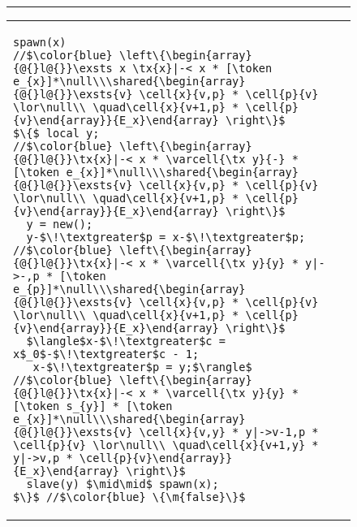 \begin{figure}
\centering
\noindent\hrule
\begin{tabular}{@{} l @{\hspace{4ex}} l@{}}
{\begin{lstlisting}
spawn(x)
//$\color{blue} \left\{\begin{array}{@{}l@{}}\exsts x \tx{x}|-< x * [\token e_{x}]*\null\\\shared{\begin{array}{@{}l@{}}\exsts{v} \cell{x}{v,p} * \cell{p}{v} \lor\null\\ \quad\cell{x}{v+1,p} * \cell{p}{v}\end{array}}{E_x}\end{array} \right\}$
$\{$ local y;
//$\color{blue} \left\{\begin{array}{@{}l@{}}\tx{x}|-< x * \varcell{\tx y}{-} * [\token e_{x}]*\null\\\shared{\begin{array}{@{}l@{}}\exsts{v} \cell{x}{v,p} * \cell{p}{v} \lor\null\\ \quad\cell{x}{v+1,p} * \cell{p}{v}\end{array}}{E_x}\end{array} \right\}$
  y = new();
  y-$\!\textgreater$p = x-$\!\textgreater$p;
//$\color{blue} \left\{\begin{array}{@{}l@{}}\tx{x}|-< x * \varcell{\tx y}{y} * y|->-,p * [\token e_{p}]*\null\\\shared{\begin{array}{@{}l@{}}\exsts{v} \cell{x}{v,p} * \cell{p}{v} \lor\null\\ \quad\cell{x}{v+1,p} * \cell{p}{v}\end{array}}{E_x}\end{array} \right\}$
  $\langle$x-$\!\textgreater$c = x$_0$-$\!\textgreater$c - 1;
   x-$\!\textgreater$p = y;$\rangle$
//$\color{blue} \left\{\begin{array}{@{}l@{}}\tx{x}|-< x * \varcell{\tx y}{y} * [\token s_{y}] * [\token e_{x}]*\null\\\shared{\begin{array}{@{}l@{}}\exsts{v} \cell{x}{v,y} * y|->v-1,p * \cell{p}{v} \lor\null\\ \quad\cell{x}{v+1,y} * y|->v,p * \cell{p}{v}\end{array}}{E_x}\end{array} \right\}$
  slave(y) $\mid\mid$ spawn(x);
$\}$ //$\color{blue} \{\m{false}\}$
\end{lstlisting}}
&
\begin{lstlisting}

\end{lstlisting}
\end{tabular}
\end{figure}
